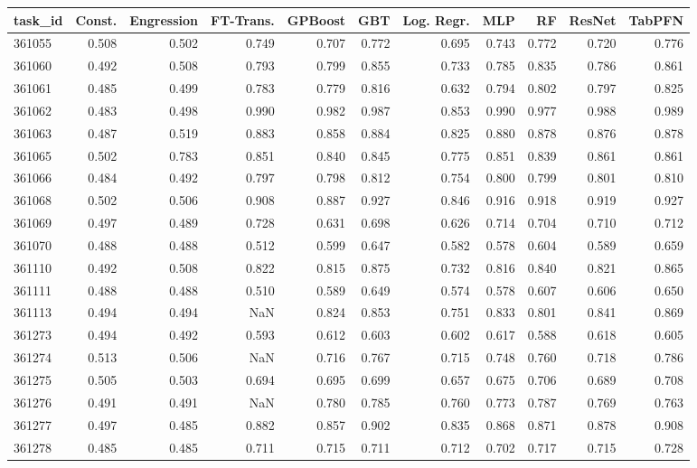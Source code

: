 \begin{tabular}{lrrrrrrrrrr}
\toprule
task\_id & Const. & Engression & FT-Trans. & GPBoost & GBT & Log. Regr. & MLP & RF & ResNet & TabPFN \\
\midrule
361055 & 0.508 & 0.502 & 0.749 & 0.707 & 0.772 & 0.695 & 0.743 & 0.772 & 0.720 & 0.776 \\
361060 & 0.492 & 0.508 & 0.793 & 0.799 & 0.855 & 0.733 & 0.785 & 0.835 & 0.786 & 0.861 \\
361061 & 0.485 & 0.499 & 0.783 & 0.779 & 0.816 & 0.632 & 0.794 & 0.802 & 0.797 & 0.825 \\
361062 & 0.483 & 0.498 & 0.990 & 0.982 & 0.987 & 0.853 & 0.990 & 0.977 & 0.988 & 0.989 \\
361063 & 0.487 & 0.519 & 0.883 & 0.858 & 0.884 & 0.825 & 0.880 & 0.878 & 0.876 & 0.878 \\
361065 & 0.502 & 0.783 & 0.851 & 0.840 & 0.845 & 0.775 & 0.851 & 0.839 & 0.861 & 0.861 \\
361066 & 0.484 & 0.492 & 0.797 & 0.798 & 0.812 & 0.754 & 0.800 & 0.799 & 0.801 & 0.810 \\
361068 & 0.502 & 0.506 & 0.908 & 0.887 & 0.927 & 0.846 & 0.916 & 0.918 & 0.919 & 0.927 \\
361069 & 0.497 & 0.489 & 0.728 & 0.631 & 0.698 & 0.626 & 0.714 & 0.704 & 0.710 & 0.712 \\
361070 & 0.488 & 0.488 & 0.512 & 0.599 & 0.647 & 0.582 & 0.578 & 0.604 & 0.589 & 0.659 \\
361110 & 0.492 & 0.508 & 0.822 & 0.815 & 0.875 & 0.732 & 0.816 & 0.840 & 0.821 & 0.865 \\
361111 & 0.488 & 0.488 & 0.510 & 0.589 & 0.649 & 0.574 & 0.578 & 0.607 & 0.606 & 0.650 \\
361113 & 0.494 & 0.494 & NaN & 0.824 & 0.853 & 0.751 & 0.833 & 0.801 & 0.841 & 0.869 \\
361273 & 0.494 & 0.492 & 0.593 & 0.612 & 0.603 & 0.602 & 0.617 & 0.588 & 0.618 & 0.605 \\
361274 & 0.513 & 0.506 & NaN & 0.716 & 0.767 & 0.715 & 0.748 & 0.760 & 0.718 & 0.786 \\
361275 & 0.505 & 0.503 & 0.694 & 0.695 & 0.699 & 0.657 & 0.675 & 0.706 & 0.689 & 0.708 \\
361276 & 0.491 & 0.491 & NaN & 0.780 & 0.785 & 0.760 & 0.773 & 0.787 & 0.769 & 0.763 \\
361277 & 0.497 & 0.485 & 0.882 & 0.857 & 0.902 & 0.835 & 0.868 & 0.871 & 0.878 & 0.908 \\
361278 & 0.485 & 0.485 & 0.711 & 0.715 & 0.711 & 0.712 & 0.702 & 0.717 & 0.715 & 0.728 \\

\end{tabular}
